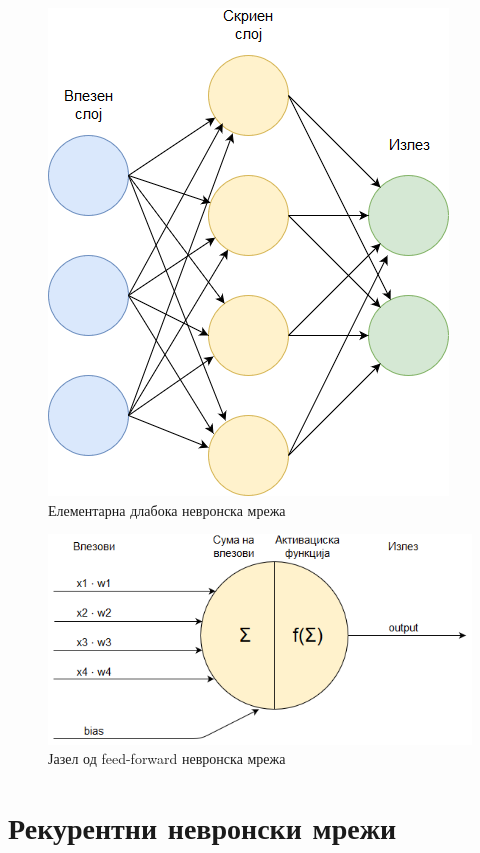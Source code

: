 \begin{figure}[H]
	\centering
    \includegraphics[scale=0.66]{images/nn.png}
	\caption{Елементарна длабока невронска мрежа}
	\label{fig:nn}
\end{figure}

\begin{figure}[H]
	\centering
    \includegraphics[scale=0.6]{images/nn_cell.png}
	\caption{Јазел од feed-forward невронска мрежа}
	\label{fig:ff_node}
\end{figure}


\section{Рекурентни невронски мрежи}

